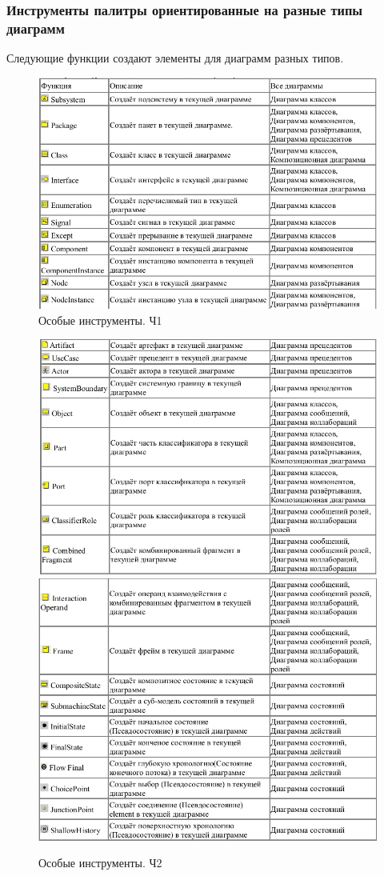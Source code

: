 \documentclass[a4paper,12pt]{report}
\begin{document}
\subsubsection*{Инструменты палитры ориентированные на разные типы диаграмм}
Следующие функции создают элементы для диаграмм разных типов.
\begin{figure}[h!]
	\centering
	\includegraphics[width=0.9\linewidth]{images/diffinstruments1}
	\caption{Особые инструменты. Ч1}
	\label{fig:diffinstruments1}
\end{figure}
\newpage
\begin{figure}[h!]
	\centering
	\includegraphics[width=0.9\linewidth]{images/diffinstruments2}
	\includegraphics[width=0.9\linewidth]{images/diffinstruments3}
	\caption{Особые инструменты. Ч2}
	\label{fig:diffinstruments2}
\end{figure}
\end{document}
